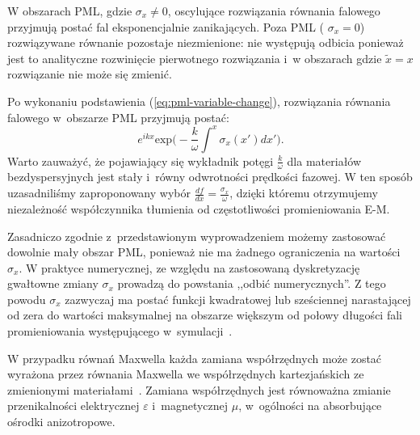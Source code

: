 W obszarach PML, gdzie $\sigma_x\ne0$, oscylujące rozwiązania równania falowego przyjmują postać fal eksponencjalnie zanikających. Poza PML ( $\sigma_x=0$) rozwiązywane równanie pozostaje niezmienione: nie występują odbicia ponieważ jest to analityczne rozwinięcie pierwotnego rozwiązania i~w obszarach gdzie $\tilde{x}=x$ rozwiązanie nie może się zmienić.

Po wykonaniu podstawienia (\ref{eq:pml-variable-change}), rozwiązania równania falowego w~obszarze PML przyjmują postać:
\begin{equation}
e^{ikx}\textrm{exp}\Big(-\frac{k}{\omega}\int^x \sigma_x(x')dx'\Big).
\end{equation}
Warto zauważyć, że pojawiający się wykładnik potęgi $\frac{k}{\omega}$ dla materiałów bezdyspersyjnych jest stały i~równy odwrotności prędkości fazowej. W ten sposób uzasadniliśmy zaproponowany wybór $\frac{df}{dx}=\frac{\sigma_x}{\omega}$, dzięki któremu otrzymujemy niezależność współczynnika tłumienia od częstotliwości promieniowania E-M. 

Zasadniczo zgodnie z~przedstawionym wyprowadzeniem możemy zastosować dowolnie mały obszar PML, ponieważ nie ma żadnego ograniczenia na wartości $\sigma_x$. W praktyce numerycznej, ze względu na zastosowaną dyskretyzację gwałtowne zmiany $\sigma_x$ prowadzą do powstania ,,odbić numerycznych''. Z tego powodu $\sigma_x$ zazwyczaj ma postać funkcji kwadratowej lub sześciennej narastającej od zera do wartości maksymalnej na obszarze większym od połowy długości fali promieniowania występującego w~symulacji~\cite{johnson2008notes}.

W przypadku równań Maxwella każda zamiana współrzędnych może zostać wyrażona przez równania Maxwella we współrzędnych kartezjańskich ze zmienionymi materiałami~\cite{ward1996refraction}. Zamiana współrzędnych jest równoważna zmianie przenikalności elektrycznej $\varepsilon$ i~magnetycznej $\mu$, w~ogólności na absorbujące ośrodki anizotropowe. 

